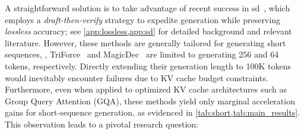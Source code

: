 A straightforward solution is to take advantage of recent success in \ac{sd}~\citep{sd1,sd2}, which employs a \textit{draft-then-verify} strategy to expedite generation while preserving \textit{lossless} accuracy; see \cref{app:lossless,app:sd} for detailed background and relevant literature.
However, these methods are generally tailored for generating short sequences, \eg, TriForce~\citep{triforce} and MagicDec~\citep{magicdec} are limited to generating 256 and 64 tokens, respectively. Directly extending their generation length to 100K tokens would inevitably encounter failures due to KV cache budget constraints. Furthermore, even when applied to optimized KV cache architectures such as Group Query Attention (GQA), these methods yield only marginal acceleration gains for short-sequence generation, as evidenced in \cref{tab:short,tab:main_results}.
This observation leads to a pivotal research question:



